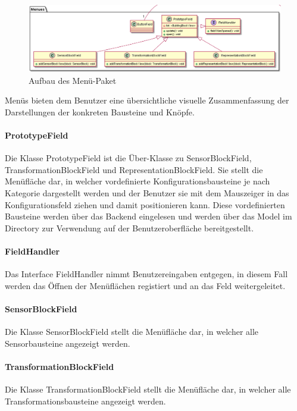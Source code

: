 \documentclass[parskip=full]{scrartcl}
\begin{document}
\begin{figure}[htbp]
	\begin{center}
		\includegraphics[width = 14cm]{Grafiken/View/MenuesNamespace.png}
		\caption{Aufbau des Menü-Paket}
		\label{Menues}
	\end{center}
\end{figure}

Menüs bieten dem Benutzer eine übersichtliche visuelle Zusammenfassung der Darstellungen der konkreten Bausteine und Knöpfe. 


\paragraph{PrototypeField}
Die Klasse PrototypeField ist die Über-Klasse zu SensorBlockField, TransformationBlockField und RepresentationBlockField. 
Sie stellt die Menüfläche dar, in welcher vordefinierte Konfigurationsbausteine je nach Kategorie dargestellt werden und der Benutzer sie mit dem Mauszeiger in das Konfigurationsfeld ziehen und damit positionieren kann. Diese vordefinierten Bausteine werden über das Backend eingelesen und werden über das Model im Directory zur Verwendung auf der Benutzeroberfläche bereitgestellt.

\paragraph{FieldHandler}
Das Interface FieldHandler nimmt Benutzereingaben entgegen, in diesem Fall werden das Öffnen der Menüflächen registiert und an das Feld weitergeleitet.

\paragraph{SensorBlockField}
Die Klasse SensorBlockField stellt die Menüfläche dar, in welcher alle Sensorbausteine angezeigt werden.

\paragraph{TransformationBlockField}
Die Klasse TransformationBlockField stellt die Menüfläche dar, in welcher alle Transformationsbausteine angezeigt werden.
\end{document}
